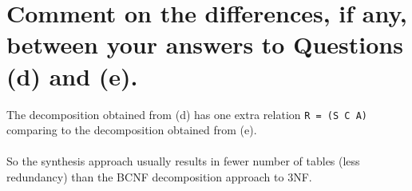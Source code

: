 \documentclass{article}
\begin{document}
\section{Comment on the differences, if any, between your answers to Questions (d) and (e).}
The decomposition obtained from (d) has one extra relation \texttt{R = (S C A)} comparing to the decomposition obtained from (e).\\
\\
So the synthesis approach usually results in fewer number of tables (less redundancy) than the BCNF decomposition approach to 3NF.
\end{document}

